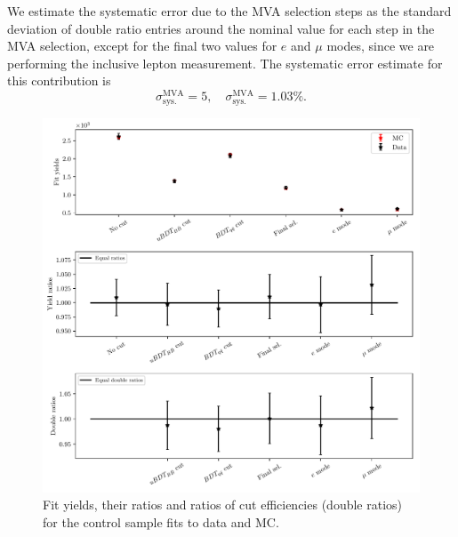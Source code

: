 We estimate the systematic error due to the MVA selection steps as the standard deviation of double ratio entries around the nominal value for each step in the MVA selection, except for the final two values for $e$ and $\mu$ modes, since we are performing the inclusive lepton measurement. The systematic error estimate for this contribution is 
\begin{equation}
\sigma_{\mathrm{sys.}}^{\mathrm{MVA}} = 5,\quad\sigma_{\mathrm{sys.}}^{\mathrm{MVA}} = 1.03\%.
\end{equation}

\begin{figure}[h]
	\centering
	\captionsetup{width=0.8\linewidth}
	\includegraphics[width=\linewidth]{fig/cs_fits.pdf}
	\caption{Fit yields, their ratios and ratios of cut efficiencies (double ratios) for the control sample fits to data and MC.}
	\label{fig:cs_fits}
\end{figure}

